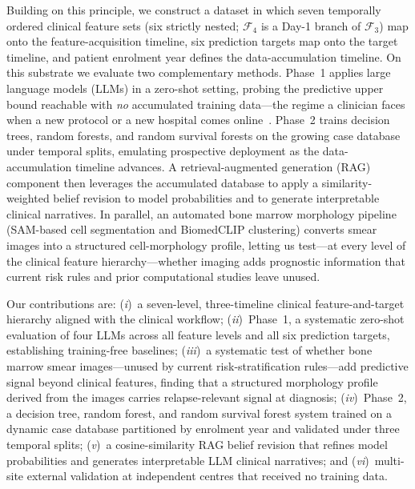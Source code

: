 \documentclass[pdflatex,sn-nature]{sn-jnl}
\begin{document}
Building on this principle, we construct a dataset in which seven
temporally ordered clinical feature sets (six strictly nested;
$\mathcal{F}_4$ is a Day-1 branch of $\mathcal{F}_3$) map onto
the feature-acquisition timeline, six prediction targets map onto the
target timeline, and patient enrolment year defines the
data-accumulation timeline.
On this substrate we evaluate two complementary methods.
Phase~1 applies large language models (LLMs) in a zero-shot setting,
probing the predictive upper bound reachable with \emph{no} accumulated
training data—the regime a clinician faces when a new protocol or a new
hospital comes online~\cite{[CITE:Phaterpekar2026]}.
Phase~2 trains decision trees, random forests, and random survival
forests on the growing case database under temporal splits, emulating
prospective deployment as the data-accumulation timeline advances.
A retrieval-augmented generation (RAG) component then leverages the
accumulated database to apply a similarity-weighted belief revision to
model probabilities and to generate interpretable clinical narratives.
In parallel, an automated bone marrow morphology pipeline (SAM-based
cell segmentation and BiomedCLIP clustering) converts smear images
into a structured cell-morphology profile, letting us test—at every
level of the clinical feature hierarchy—whether imaging adds
prognostic information that current risk rules and prior computational
studies leave unused.


Our contributions are: (\textit{i})~a seven-level, three-timeline
clinical feature-and-target hierarchy aligned with the clinical
workflow; (\textit{ii})~Phase~1, a systematic zero-shot evaluation of
four LLMs across all feature levels and all six prediction targets,
establishing training-free baselines; (\textit{iii})~a systematic
test of whether bone marrow smear images—unused by current
risk-stratification rules—add predictive signal beyond clinical
features, finding that a structured morphology profile derived from
the images carries relapse-relevant signal at diagnosis; (\textit{iv})~Phase~2, a decision
tree, random forest, and random survival forest system trained on a
dynamic case database partitioned by enrolment year and validated
under three temporal splits; (\textit{v})~a cosine-similarity RAG
belief revision that refines model probabilities and generates
interpretable LLM clinical narratives; and (\textit{vi})~multi-site
external validation at independent centres that received no training
data.
\fi


\end{document}
